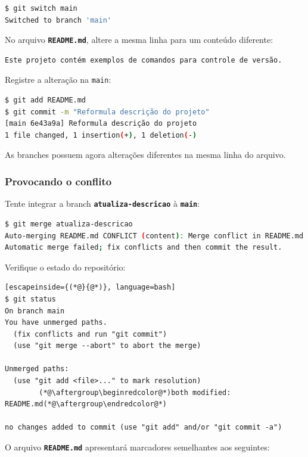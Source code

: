 \documentclass[12pt,a4paper]{article}
\begin{document}
\begin{lstlisting}[language=bash]
$ git switch main
Switched to branch 'main'
\end{lstlisting}

No arquivo \textbf{\texttt{README.md}}, altere a mesma linha para um conteúdo diferente:

\begin{lstlisting}
Este projeto contém exemplos de comandos para controle de versão.
\end{lstlisting}

Registre a alteração na \texttt{main}:

\begin{lstlisting}[language=bash]
$ git add README.md
$ git commit -m "Reformula descrição do projeto" 
[main 6e43a9a] Reformula descrição do projeto
1 file changed, 1 insertion(+), 1 deletion(-)
\end{lstlisting}

As branches possuem agora alterações diferentes na mesma linha do arquivo.

\subsubsection{Provocando o conflito}

Tente integrar a branch \textbf{\texttt{atualiza-descricao}} à \textbf{\texttt{main}}: 

\begin{lstlisting}[language=bash]
$ git merge atualiza-descricao
Auto-merging README.md CONFLICT (content): Merge conflict in README.md
Automatic merge failed; fix conflicts and then commit the result.
\end{lstlisting}

Verifique o estado do repositório: 

\begin{lstlisting}[escapeinside={(*@}{@*)}, language=bash]
$ git status
On branch main
You have unmerged paths.
  (fix conflicts and run "git commit")
  (use "git merge --abort" to abort the merge)

Unmerged paths:
  (use "git add <file>..." to mark resolution)
        (*@\aftergroup\beginredcolor@*)both modified:   README.md(*@\aftergroup\endredcolor@*)

no changes added to commit (use "git add" and/or "git commit -a")
\end{lstlisting}

O arquivo \textbf{\texttt{README.md}} apresentará marcadores semelhantes aos seguintes: 
\end{document}
